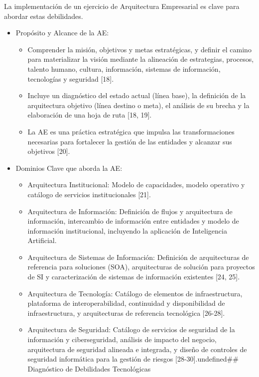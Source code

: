 \documentclass[
	a4paper, %
	12pt, %
]{include/CSSullivanBusinessReport}
\def\tightlist{}
\begin{document}
La implementación de un ejercicio de Arquitectura Empresarial es clave
para abordar estas debilidades.

\begin{itemize}
\tightlist
\item
  Propósito y Alcance de la AE:

  \begin{itemize}
  \tightlist
  \item
    Comprender la misión, objetivos y metas estratégicas, y definir el
    camino para materializar la visión mediante la alineación de
    estrategias, procesos, talento humano, cultura, información,
    sistemas de información, tecnologías y seguridad {[}18{]}.
  \item
    Incluye un diagnóstico del estado actual (línea base), la definición
    de la arquitectura objetivo (línea destino o meta), el análisis de
    su brecha y la elaboración de una hoja de ruta {[}18, 19{]}.
  \item
    La AE es una práctica estratégica que impulsa las transformaciones
    necesarias para fortalecer la gestión de las entidades y alcanzar
    sus objetivos {[}20{]}.
  \end{itemize}
\item
  Dominios Clave que aborda la AE:

  \begin{itemize}
  \tightlist
  \item
    Arquitectura Institucional: Modelo de capacidades, modelo operativo
    y catálogo de servicios institucionales {[}21{]}.
  \item
    Arquitectura de Información: Definición de flujos y arquitectura de
    información, intercambio de información entre entidades y modelo de
    información institucional, incluyendo la aplicación de Inteligencia
    Artificial.
  \item
    Arquitectura de Sistemas de Información: Definición de arquitecturas
    de referencia para soluciones (SOA), arquitecturas de solución para
    proyectos de SI y caracterización de sistemas de información
    existentes {[}24, 25{]}.
  \item
    Arquitectura de Tecnología: Catálogo de elementos de
    infraestructura, plataforma de interoperabilidad, continuidad y
    disponibilidad de infraestructura, y arquitecturas de referencia
    tecnológica {[}26-28{]}.
  \item
    Arquitectura de Seguridad: Catálogo de servicios de seguridad de la
    información y ciberseguridad, análisis de impacto del negocio,
    arquitectura de seguridad alineada e integrada, y diseño de
    controles de seguridad informática para la gestión de riesgos
    {[}28-30{]}.undefined\#\# Diagnóstico de Debilidades Tecnológicas
  \end{itemize}
\end{itemize}
\end{document}
